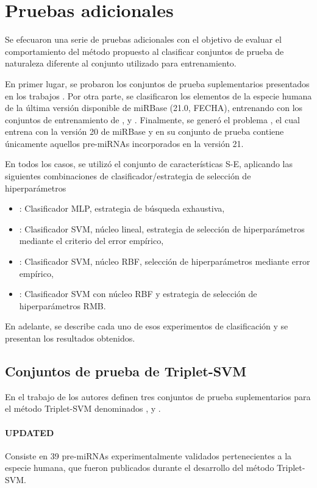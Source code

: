 \section{Pruebas adicionales}
Se efecuaron una serie de pruebas adicionales con el objetivo de
evaluar el comportamiento del método propuesto al clasificar conjuntos
de prueba de naturaleza diferente al conjunto utilizado para
entrenamiento.

En primer lugar, se probaron los conjuntos de prueba suplementarios
presentados en los trabajos \cite{xue,ng}.  Por otra parte, se
clasificaron los elementos de la especie humana de la última versión
disponible de miRBase (21.0, FECHA), entrenando con los conjuntos de
entrenamiento de \tripletsvm{}, \mipred{} y \micropred{}.
Finalmente, se generó el problema \deltamirbase{}, el cual entrena con
la versión 20 de miRBase y en su conjunto de prueba contiene
únicamente aquellos pre-miRNAs incorporados en la versión 21.

En todos los casos, se utilizó el conjunto de características S-E,
aplicando las siguientes combinaciones de clasificador/estrategia de
selección de hiperparámetros

\begin{itemize}
\item {}: Clasificador MLP, estrategia de búsqueda
  exhaustiva,
\item {}: Clasificador SVM, núcleo lineal, estrategia de
  selección de hiperparámetros mediante el criterio del error
  empírico,
\item {}: Clasificador SVM, núcleo RBF, selección de
  hiperparámetros mediante error empírico,
\item {}: Clasificador SVM con núcleo RBF y estrategia de
  selección de hiperparámetros RMB.
\end{itemize}

En adelante, se describe cada uno de esos experimentos de
clasificación y se presentan los resultados obtenidos.

\subsection{Conjuntos de prueba de Triplet-SVM}
En el trabajo de \citeauthor{xue} \cite{xue} los autores definen tres
conjuntos de prueba suplementarios para el método Triplet-SVM
denominados ,  y
.
\paragraph{UPDATED}
Consiste en 39 pre-miRNAs experimentalmente validados pertenecientes a
la especie humana, que fueron publicados durante el desarrollo del
método Triplet-SVM.
